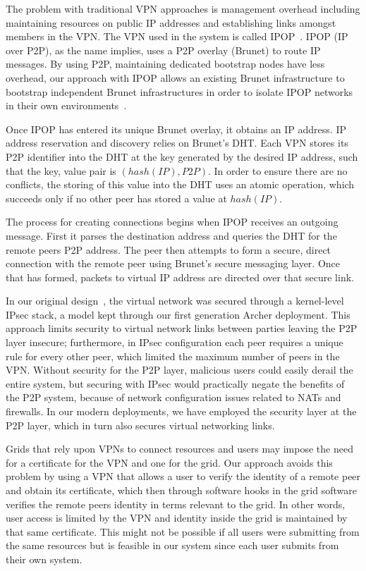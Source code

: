 \documentclass[twocolumn]{svjour3}
\begin{document}
The problem with traditional VPN approaches is management overhead including
maintaining resources on public IP addresses and establishing links amongst
members in the VPN.  The VPN used in the system is called
IPOP~\cite{groupvpn,ipop}.  IPOP (IP over P2P), as the name implies, uses a P2P
overlay (Brunet) to route IP messages.  By using P2P, maintaining dedicated
bootstrap nodes have less overhead, our approach with IPOP allows an existing
Brunet infrastructure to bootstrap independent Brunet infrastructures in order
to isolate IPOP networks in their own environments~\cite{bootstrapping}.

Once IPOP has entered its unique Brunet overlay, it obtains an IP address.  IP
address reservation and discovery relies on Brunet's DHT.  Each VPN stores its
P2P identifier into the DHT at the key generated by the desired IP address,
such that the key, value pair is $(hash(IP), P2P)$.  In order to ensure there
are no conflicts, the storing of this value into the DHT uses an atomic
operation, which succeeds only if no other peer has stored a value at
$hash(IP)$.

The process for creating connections begins when IPOP receives an outgoing
message.  First it parses the destination address and queries the DHT for the
remote peers P2P address.  The peer then attempts to form a secure, direct
connection with the remote peer using Brunet's secure messaging layer.  Once
that has formed, packets to virtual IP address are directed over that secure
link.

In our original design~\cite{vtdc}, the virtual network was secured through a
kernel-level IPsec stack, a model kept through our first generation Archer
deployment.  This approach limits security to virtual network links between
parties leaving the P2P layer insecure; furthermore, in IPsec configuration
each peer requires a unique rule for every other peer, which limited the
maximum number of peers in the VPN.  Without security for the P2P layer,
malicious users could easily derail the entire system, but securing with IPsec
would practically negate the benefits of the P2P system, because of network
configuration issues related to NATs and firewalls.  In our modern deployments,
we have employed the security layer at the P2P layer, which in turn also
secures virtual networking links.

Grids that rely upon VPNs to connect resources and users may impose the need
for a certificate for the VPN and one for the grid.  Our approach avoids this
problem by using a VPN that allows a user to verify the identity of a remote
peer and obtain its certificate, which then through software hooks in the grid
software verifies the remote peers identity in terms relevant to the grid.  In
other words, user access is limited by the VPN and identity inside the grid is
maintained by that same certificate.  This might not be possible if all users
were submitting from the same resources but is feasible in our system since
each user submits from their own system.
\end{document}
